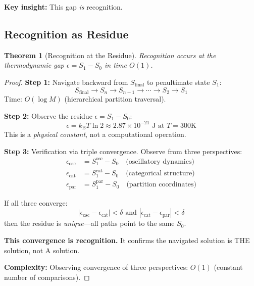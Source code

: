 \documentclass[twocolumn,10pt]{article}
\newtheorem{theorem}{Theorem}[section]
\theoremstyle{definition}
\theoremstyle{remark}
\newcommand{\kB}{k_{\text{B}}}
\begin{document}
\vspace{0.2cm}
\noindent\textbf{Key insight:} This gap \textit{is} recognition.

\subsection{Recognition as Residue}

\begin{theorem}[Recognition at the Residue]
\label{thm:recognition_residue}
Recognition occurs at the thermodynamic gap $\epsilon = S_1 - S_0$ in time $O(1)$.
\end{theorem}

\begin{proof}
\textbf{Step 1:} Navigate backward from $S_{\text{final}}$ to penultimate state $S_1$:
\begin{equation}
S_{\text{final}} \to S_n \to S_{n-1} \to \cdots \to S_2 \to S_1
\end{equation}
Time: $O(\log M)$ (hierarchical partition traversal).

\vspace{0.2cm}
\noindent\textbf{Step 2:} Observe the residue $\epsilon = S_1 - S_0$:
\begin{equation}
\epsilon = \kB T \ln 2 \approx 2.87 \times 10^{-21} \text{ J at } T = 300\text{K}
\end{equation}
This is a \textit{physical constant}, not a computational operation.

\vspace{0.2cm}
\noindent\textbf{Step 3:} Verification via triple convergence. Observe from three perspectives:
\begin{align}
\epsilon_{\text{osc}} &= S_1^{\text{osc}} - S_0 \quad \text{(oscillatory dynamics)} \\
\epsilon_{\text{cat}} &= S_1^{\text{cat}} - S_0 \quad \text{(categorical structure)} \\
\epsilon_{\text{par}} &= S_1^{\text{par}} - S_0 \quad \text{(partition coordinates)}
\end{align}

If all three converge:
\begin{equation}
|\epsilon_{\text{osc}} - \epsilon_{\text{cat}}| < \delta \text{ and } |\epsilon_{\text{cat}} - \epsilon_{\text{par}}| < \delta
\end{equation}
then the residue is \textit{unique}—all paths point to the same $S_0$.

\vspace{0.2cm}
\noindent\textbf{This convergence is recognition.} It confirms the navigated solution is THE solution, not A solution.

\vspace{0.2cm}
\noindent\textbf{Complexity:} Observing convergence of three perspectives: $O(1)$ (constant number of comparisons).
\end{proof}
\end{document}
